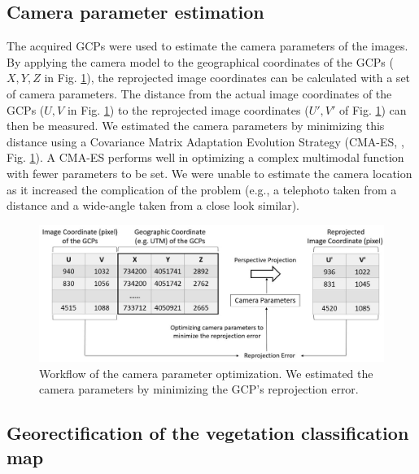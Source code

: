 \documentclass{article}
\begin{document}
\hypertarget{camera-parameter-estimation}{%
\subsection{Camera parameter estimation}\label{camera-parameter-estimation}}

The acquired GCPs were used to estimate the camera parameters of the images. By applying the camera model to the geographical coordinates of the GCPs (\(X, Y, Z\) in Fig. \ref{fig:optim}), the reprojected image coordinates can be calculated with a set of camera parameters. The distance from the actual image coordinates of the GCPs (\(U, V\) in Fig. \ref{fig:optim}) to the reprojected image coordinates (\(U', V'\) of Fig. \ref{fig:optim}) can then be measured. We estimated the camera parameters by minimizing this distance using a Covariance Matrix Adaptation Evolution Strategy (CMA-ES, \cite{Hansen2003CMAES}, Fig. \ref{fig:optim}). A CMA-ES performs well in optimizing a complex multimodal function with fewer parameters to be set. We were unable to estimate the camera location as it increased the complication of the problem (e.g., a telephoto taken from a distance and a wide-angle taken from a close look similar).



\begin{figure}
\includegraphics[width=1\linewidth]{paper_files/figures/Slide5} \caption{Workflow of the camera parameter optimization. We estimated the camera parameters by minimizing the GCP's reprojection error.}\label{fig:optim}
\end{figure}

\hypertarget{georectification-of-the-vegetation-map}{%
\subsection{Georectification of the vegetation classification map}\label{georectification-of-the-vegetation-map}}
\end{document}
